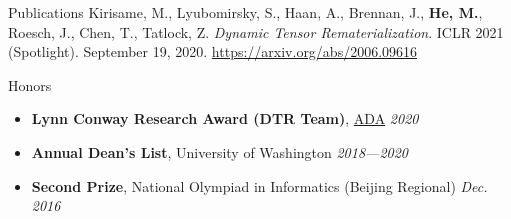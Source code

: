 \documentclass{resume}
\begin{document}
	\begin{rSection}{Publications}
		Kirisame, M., Lyubomirsky, S., Haan, A., Brennan, J., \textbf{He, M.}, Roesch, J., Chen, T., Tatlock, Z. \textit{Dynamic Tensor Rematerialization}. ICLR 2021 (Spotlight). September 19, 2020. \href{https://arxiv.org/abs/2006.09616}{https://arxiv.org/abs/2006.09616}
	\end{rSection}
	

	\begin{rSection}{Honors}
		\begin{itemize}
			\setlength{\itemsep}{1pt}
			\setlength{\parskip}{0pt}
			\setlength{\parsep}{0pt}
			\item \textbf{Lynn Conway Research Award (DTR Team)}, \href{https://adacenter.org}{ADA} \hfill {\em 2020}
			\item \textbf{Annual Dean's List}, University of Washington \hfill {\em 2018---2020}
			\item \textbf{Second Prize}, National Olympiad in Informatics (Beijing Regional) \hfill {\em Dec. 2016}
		\end{itemize}
	\end{rSection}
\end{document}
